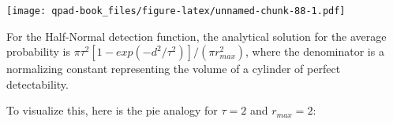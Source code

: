 \documentclass[12pt,]{book}
\newenvironment{Shaded}{\begin{snugshade}}{\end{snugshade}}
\newcommand{\ControlFlowTok}[1]{\textcolor[rgb]{0.13,0.29,0.53}{\textbf{#1}}}
\newcommand{\DataTypeTok}[1]{\textcolor[rgb]{0.13,0.29,0.53}{#1}}
\newcommand{\DecValTok}[1]{\textcolor[rgb]{0.00,0.00,0.81}{#1}}
\newcommand{\KeywordTok}[1]{\textcolor[rgb]{0.13,0.29,0.53}{\textbf{#1}}}
\newcommand{\NormalTok}[1]{#1}
\newcommand{\OperatorTok}[1]{\textcolor[rgb]{0.81,0.36,0.00}{\textbf{#1}}}
\newcommand{\StringTok}[1]{\textcolor[rgb]{0.31,0.60,0.02}{#1}}
\begin{document}
\begin{Shaded}
\end{Shaded}

\texttt{[image: qpad-book\_files/figure-latex/unnamed-chunk-88-1.pdf]}

For the Half-Normal detection function, the analytical solution for the
average probability is
\(\pi \tau^2 [1-exp(-d^2/\tau^2)] / (\pi r_{max}^2)\),
where the denominator is a normalizing constant
representing the volume of a cylinder of perfect detectability.

To visualize this, here is the pie analogy for
\(\tau=2\) and \(r_{max}=2\):
\end{document}
